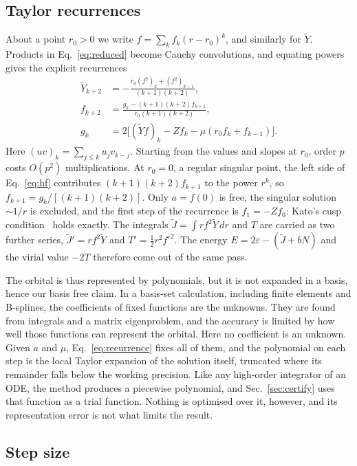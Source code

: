 \documentclass[aps,pra,reprint,superscriptaddress,amsmath,amssymb,longbibliography]{revtex4-2}
\begin{document}
\subsection{Taylor recurrences}

About a point $r_0>0$ we write $f=\sum_kf_k(r-r_0)^k$, and similarly for $\tilde Y$. Products in Eq.~\eqref{eq:reduced} become Cauchy convolutions, and equating powers gives the explicit recurrences
\begin{align}
\tilde Y_{k+2}&=-\frac{r_0(f^2)_k+(f^2)_{k-1}}{(k+1)(k+2)}, \nonumber\\
f_{k+2}&=\frac{g_k-(k+1)(k+2)f_{k+1}}{r_0(k+1)(k+2)}, \label{eq:recurrence}\\
g_k&=2\big[(\tilde Yf)_k-Zf_k-\mu(r_0f_k+f_{k-1})\big]. \nonumber
\end{align}
Here $(uv)_k=\sum_{j\le k}u_jv_{k-j}$. Starting from the values and slopes at $r_0$, order $p$ costs $O(p^2)$ multiplications. At $r_0=0$, a regular singular point, the left side of Eq.~\eqref{eq:hf} contributes $(k+1)(k+2)f_{k+1}$ to the power $r^k$, so $f_{k+1}=g_k/[(k+1)(k+2)]$. Only $a=f(0)$ is free, the singular solution $\sim1/r$ is excluded, and the first step of the recurrence is $f_1=-Zf_0$: Kato's cusp condition~\cite{Kato1957} holds exactly. The integrals $\tilde J=\int r f^2\tilde Y\,dr$ and $T$ are carried as two further series, $\tilde J'=rf^2\tilde Y$ and $T'=\tfrac12r^2f'^2$. The energy $E=2\varepsilon-(\tilde J+bN)$ and the virial value $-2T$ therefore come out of the same pass.

The orbital is thus represented by polynomials, but it is not expanded in a basis, hence our basis free claim. In a basis-set calculation, including finite elements and B-splines, the coefficients of fixed functions are the unknowns. They are found from integrals and a matrix eigenproblem, and the accuracy is limited by how well those functions can represent the orbital. Here no coefficient is an unknown. Given $a$ and $\mu$, Eq.~\eqref{eq:recurrence} fixes all of them, and the polynomial on each step is the local Taylor expansion of the solution itself, truncated where its remainder falls below the working precision. Like any high-order integrator of an ODE, the method produces a piecewise polynomial, and Sec.~\ref{sec:certify} uses that function as a trial function. Nothing is optimised over it, however, and its representation error is not what limits the result.

\subsection{Step size}
\end{document}
